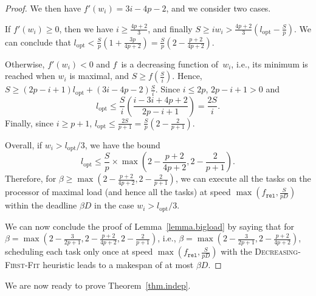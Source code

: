 \documentclass[a4paper]{article}
\theoremstyle{plain}
\theoremstyle{definition}
\theoremstyle{remark}
\newcommand{\fr}{\ensuremath{f_{\texttt{rel}}}\xspace}
\newcommand{\dff}{\textsc{Dec\-reasing-First-Fit}\xspace}
\begin{document}
\begin{proof}
We then have $f'(w_i) = 3i-4p-2$, and we consider two cases. 


If $f'(w_i) \geq 0$, 
then we have $i\geq \frac{4p+2}{3}$, and finally 
$S \geq i w_i > \frac{4p+2}{3} \left(l_{\text{opt}} - \frac{S}{p}\right).$
We can conclude that $l_{\text{opt}} < \frac{S}{p} \left( 1+ \frac{3p}{4p+2}
\right) = \frac{S}{p} \left( 2-\frac{p+2}{4p+2} \right)$. 


Otherwise, $f'(w_i)<0$ and $f$~is a decreasing function of~$w_i$,
i.e., its minimum is reached when $w_i$ is maximal, and $S\geq
f(\frac{S}{i})$.
 Hence, $S \geq (2p-i+1) l_{\text{opt}} + (3i-4p-2) \frac{S}{i}$. 
Since $i\leq 2p$, $2p-i+1>0$ and 
$$l_{\text{opt}} \leq \frac{S}{i} \left( \frac{i-3i+4p+2}{2p-i+1}
\right) = \frac{2S}{i}. $$
Finally, since $i\geq p+1$, $l_{\text{opt}} \leq
\frac{2S}{p+1} = \frac{S}{p}\left(2-\frac{2}{p+1}\right)$. 






Overall, if $w_i > l_{\text{opt}}/3$, we have the
bound $$l_{\text{opt}} \leq \frac{S}{p} \times \max\left( 2 -
  \frac{p+2}{4p+2}, 2-\frac{2}{p+1} \right).$$ Therefore, for $ \beta
\geq \max\left( 2 - \frac{p+2}{4p+2}, 2-\frac{2}{p+1} \right)$, we can
execute all the tasks on the processor of maximal load (and hence all
the tasks) at speed $\max(\fr,\frac{S}{pD})$ within the deadline
$\beta D$ in the case $w_i > l_{\text{opt}}/3$. 

\medskip We can now conclude the proof of
Lemma~\ref{lemma.bigload} by saying that for $\beta =
\max\left(2\!-\!\frac{3}{2p+1},2\!-\!\frac{p+2}{4p+2},
  2\!-\!\frac{2}{p+1}\right)$, i.e., $\beta =
\max\left(2-\frac{3}{2p+1},2-\frac{p+2}{4p+2}\right)$, scheduling each task only once at speed $\max(\fr,\frac{S}{pD})$ with
 the \dff heuristic leads to a make\-span of at most $\beta D$.
 \end{proof}





We are now ready to prove Theorem~\ref{thm.indep}. 
\end{document}
